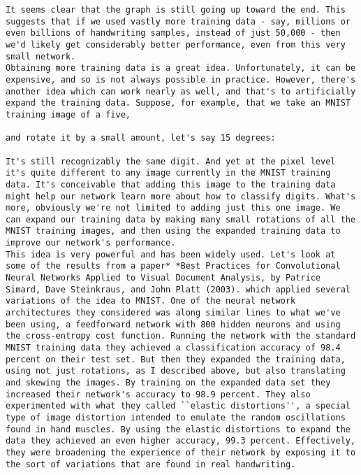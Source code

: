 \begin{lstlisting}
It seems clear that the graph is still going up toward the end. This suggests that if we used vastly more training data - say, millions or even billions of handwriting samples, instead of just 50,000 - then we'd likely get considerably better performance, even from this very small network.
Obtaining more training data is a great idea. Unfortunately, it can be expensive, and so is not always possible in practice. However, there's another idea which can work nearly as well, and that's to artificially expand the training data. Suppose, for example, that we take an MNIST training image of a five,

and rotate it by a small amount, let's say 15 degrees:

It's still recognizably the same digit. And yet at the pixel level it's quite different to any image currently in the MNIST training data. It's conceivable that adding this image to the training data might help our network learn more about how to classify digits. What's more, obviously we're not limited to adding just this one image. We can expand our training data by making many small rotations of all the MNIST training images, and then using the expanded training data to improve our network's performance.
This idea is very powerful and has been widely used. Let's look at some of the results from a paper* *Best Practices for Convolutional Neural Networks Applied to Visual Document Analysis, by Patrice Simard, Dave Steinkraus, and John Platt (2003). which applied several variations of the idea to MNIST. One of the neural network architectures they considered was along similar lines to what we've been using, a feedforward network with 800 hidden neurons and using the cross-entropy cost function. Running the network with the standard MNIST training data they achieved a classification accuracy of 98.4 percent on their test set. But then they expanded the training data, using not just rotations, as I described above, but also translating and skewing the images. By training on the expanded data set they increased their network's accuracy to 98.9 percent. They also experimented with what they called ``elastic distortions'', a special type of image distortion intended to emulate the random oscillations found in hand muscles. By using the elastic distortions to expand the data they achieved an even higher accuracy, 99.3 percent. Effectively, they were broadening the experience of their network by exposing it to the sort of variations that are found in real handwriting.

\end{lstlisting}
